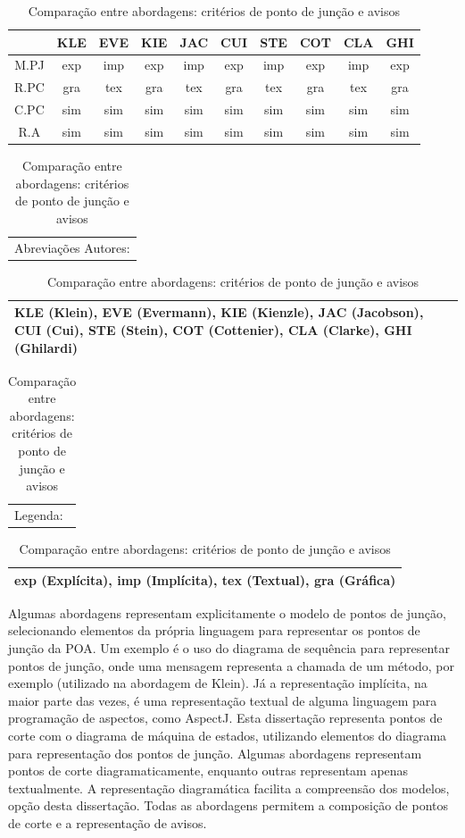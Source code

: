 \begin{table}[h]
	\centering
	\begin{tabular}{ | c | c | c | c | c | c | c | c | c | c | }
		\hline
		 & KLE & EVE & KIE & JAC & CUI & STE & COT & CLA & GHI \\
		\hline
		 M.PJ & exp & imp & exp & imp & exp & imp & exp & imp & exp  \\
		\hline
		 R.PC & gra & tex & gra & tex & gra & tex & gra & tex & gra \\
		\hline
		 C.PC & sim & sim & sim & sim & sim & sim & sim & sim & sim \\
		\hline
		 R.A & sim & sim & sim & sim & sim & sim & sim & sim & sim \\
		\hline
	\end{tabular}
	
	\hspace{2em}
	
	\begin{tabular}{  p{11cm}  }
		Abreviações Autores: \\
	\end{tabular}
	
	\begin{tabular}{ | p{11cm} | }
		\hline
		KLE (Klein), EVE (Evermann), KIE (Kienzle), JAC (Jacobson), CUI (Cui), STE (Stein), COT (Cottenier), CLA (Clarke), GHI (Ghilardi) \\
		\hline
	\end{tabular}
	
	\begin{tabular}{  p{11cm}  }
		Legenda: \\
	\end{tabular}

	\begin{tabular}{ | p{11cm} | }
		\hline
		exp (Explícita), imp (Implícita), tex (Textual), gra (Gráfica)  \\
		\hline
	\end{tabular}
	\caption{Comparação entre abordagens: critérios de ponto de junção e avisos}
	\label{tab:comparison_table_join_points_advices}
\end{table} 

Algumas abordagens representam explicitamente o modelo de pontos de junção, selecionando elementos da própria linguagem para representar os pontos de
junção da POA. Um exemplo é o uso do diagrama de sequência para representar pontos de junção, onde uma mensagem representa a chamada de um método, por
exemplo (utilizado na abordagem de Klein). Já a representação implícita, na maior parte das vezes, é uma representação textual de alguma linguagem
para programação de aspectos, como AspectJ. Esta dissertação representa pontos de corte com o diagrama de máquina de estados, utilizando elementos do diagrama 
para representação dos pontos de junção. Algumas abordagens representam pontos de corte diagramaticamente, enquanto outras representam apenas
textualmente. A representação diagramática facilita a compreensão dos modelos, opção desta dissertação. Todas as abordagens permitem a composição de
pontos de corte e a representação de avisos.


